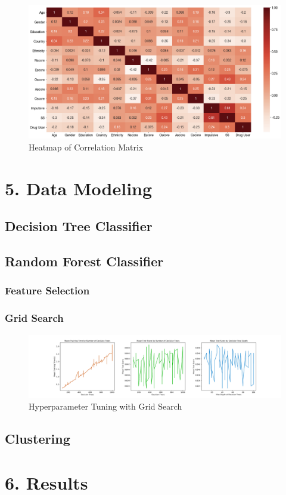 \documentclass[10pt]{article}
\begin{document}
\begin{figure}[H]
\caption{Heatmap of Correlation Matrix}
\centering
\includegraphics[scale=0.25]{heatmap.png}
\end{figure}

\section*{5. Data Modeling}

\subsection*{Decision Tree Classifier}

\subsection*{Random Forest Classifier}

\subsubsection*{Feature Selection}

\subsubsection*{Grid Search}

\begin{figure}[H]
\caption{Hyperparameter Tuning with Grid Search }
\centering
\includegraphics[scale=0.35]{gridsearch.png}
\end{figure}

\subsection*{Clustering}

\section*{6. Results}
\end{document}
